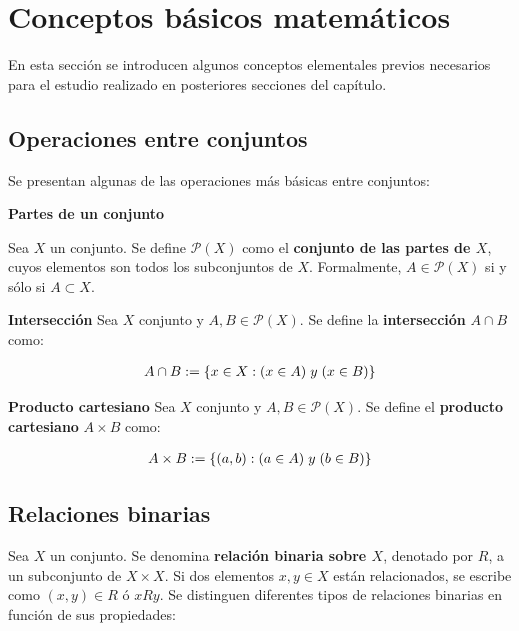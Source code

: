 \section{Conceptos básicos matemáticos}\label{section:concepts}
En esta sección se introducen algunos conceptos elementales previos necesarios para el estudio realizado en posteriores secciones del capítulo.

\subsection{Operaciones entre conjuntos}
\noindent
Se presentan algunas de las operaciones más básicas entre conjuntos:

\vspace{0.5cm}
\noindent
\textbf{Partes de un conjunto}

Sea $X$ un conjunto. Se define $\mathcal{P}(X)$ como el \textbf{conjunto de las partes de $X$}, cuyos elementos son todos los subconjuntos de $X$. Formalmente, $A \in \mathcal{P}(X)$ si y sólo si $A \subset X$.

\vspace{0.5cm}
\noindent
\textbf{Intersección}
\noindent
\newline
Sea $X$ conjunto y $A,B \in \mathcal{P}(X)$. Se define la \textbf{intersección} $A \cap B$ como:

\begin{align*}
    A \cap B := \lbrace x \in X : (x \in A) \hspace{0.1cm} y \hspace{0.1cm} (x \in B) \rbrace
\end{align*}

\vspace{0.5cm}
\noindent
\textbf{Producto cartesiano}
\noindent
\newline
Sea $X$ conjunto y $A,B \in \mathcal{P}(X)$. Se define el \textbf{producto cartesiano} $A \times B$ como:

\begin{align*}
    A \times B := \lbrace (a,b) : (a \in A) \hspace{0.1cm} y \hspace{0.1cm} (b \in B) \rbrace
\end{align*}

\subsection{Relaciones binarias}\label{subsection:binaryrel}
Sea $X$ un conjunto. Se denomina \textbf{relación binaria sobre $X$}, denotado por $R$, a un subconjunto de $X \times X$. Si dos elementos $x,y \in X$ están relacionados, se escribe como $(x,y) \in R$ ó $xRy$. Se distinguen diferentes tipos de relaciones binarias en función de sus propiedades:

